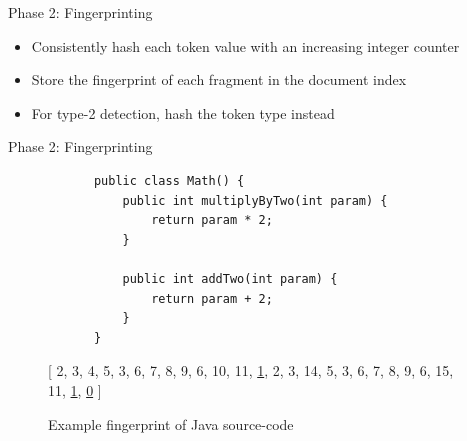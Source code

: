 \documentclass[aspectratio=1610, xcolor=table]{beamer}
\begin{document}
\begin{frame}{Phase 2: Fingerprinting}
    \begin{itemize}
        \item Consistently hash each token value with an increasing integer counter
        \item Store the fingerprint of each fragment in the document index
        \item For type-2 detection, hash the token type instead
    \end{itemize}
\end{frame}

\begin{frame}[fragile]{Phase 2: Fingerprinting}
	\newsavebox{\firstlisting}
	\begin{lrbox}{\firstlisting}
        \begin{lstlisting}
            public class Math() {
                public int multiplyByTwo(int param) {
                    return param * 2;
                }

                public int addTwo(int param) {
                    return param + 2;
                }
            }
        \end{lstlisting}
	\end{lrbox}
	\begin{figure}
		\begin{center}
            \scalebox{.75}{\usebox{\firstlisting}}
                \hspace{.5cm}
            \vspace{.5cm}

            [ 2, 3, 4, 5, 3, 6, 7, 8, 9, 6, 10, 11, \underline{1}, 2, 3, 14, 5, 3, 6, 7,
                    8, 9, 6, 15, 11, \underline{1}, \underline{0} ]
		\end{center}
		\caption{Example fingerprint of Java source-code}
		\label{fig:fingerprint}
	\end{figure}
\end{frame}
\end{document}
